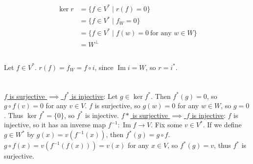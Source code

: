 \documentclass[11pt]{article}
\DeclareMathOperator{\im}{Im}
\begin{document}
\subsection{} %
\begin{align*}
	\ker r&=\{f\in V^*\mid r(f)=0\}\\
	&=\{f\in V^*\mid f_W=0\}\\
	&=\{f\in V^*\mid f(w)=0\ \text{for any $w\in W$}\}\\
	&=W^\perp
\end{align*}


\subsection{} %
Let $f\in V^*$. $r(f)=f_W=f\circ i$, since $\im i=W$, so $r=i^*$.


\section{} %
\underline{$f$ is surjective $\implies$ $f^*$ is injective}:
Let $g\in\ker f^*$. Then $f^*(g)=0$, so $g\circ f(v)=0$ for any $v\in V$. $f$
is surjective, so $g(w)=0$ for any $w\in W$, so $g=0$. Thus $\ker f^*=\{0\}$,
so $f^*$ is injective.
\newline
\newline
\underline{$f*$ is surjective $\implies$ $f$ is injective}:
$f$ is injective, so it has an inverse map $f^{-1}\colon\im f\longrightarrow
V$. Fix some $v\in V^*$. If we define $g\in W^*$ by $g(x)=v(f^{-1}(x))$, then
$f^*(g)=g\circ f$. $g\circ f(x)=v(f^{-1}(f(x)))=v(x)$ for any $x\in V$, so
$f^*(g)=v$, thus $f^*$ is surjective.
\end{document}
